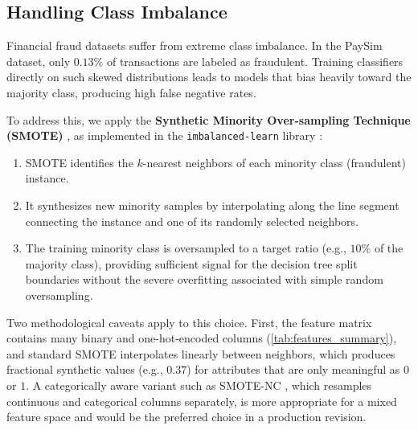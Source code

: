 \subsection{Handling Class Imbalance}
\label{sec:handling_class_imbalance}

Financial fraud datasets suffer from extreme class imbalance. In the PaySim dataset, only $0.13\%$ of transactions are labeled as fraudulent. Training classifiers directly on such skewed distributions leads to models that bias heavily toward the majority class, producing high false negative rates.

To address this, we apply the \textbf{Synthetic Minority Over-sampling Technique (SMOTE)} \citep{chawla2002smote}, as implemented in the \texttt{imbalanced-learn} library \citep{lemaitre2017imblearn}:
\begin{enumerate}
    \item SMOTE identifies the $k$-nearest neighbors of each minority class (fraudulent) instance.
    \item It synthesizes new minority samples by interpolating along the line segment connecting the instance and one of its randomly selected neighbors.
    \item The training minority class is oversampled to a target ratio (e.g., $10\%$ of the majority class), providing sufficient signal for the decision tree split boundaries without the severe overfitting associated with simple random oversampling.
\end{enumerate}

Two methodological caveats apply to this choice. First, the feature matrix contains many binary and one-hot-encoded columns (\cref{tab:features_summary}), and standard SMOTE interpolates linearly between neighbors, which produces fractional synthetic values (e.g., $0.37$) for attributes that are only meaningful as $0$ or $1$. A categorically aware variant such as SMOTE-NC \citep{chawla2002smote}, which resamples continuous and categorical columns separately, is more appropriate for a mixed feature space and would be the preferred choice in a production revision.

